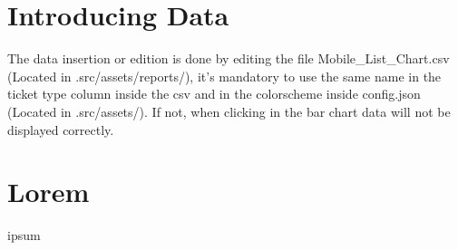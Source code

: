 \documentclass[12pt]{article}
\begin{document}
\section{Introducing Data} %
The data insertion or edition is done by editing the file Mobile\_List\_Chart.csv (Located in .src/assets/reports/), it's mandatory to use the same name in the ticket type column 
inside the csv and in the colorscheme inside config.json (Located in .src/assets/). If not, when clicking in the bar chart data will not be displayed correctly.\par

\section{Lorem} %
ipsum
\end{document}
